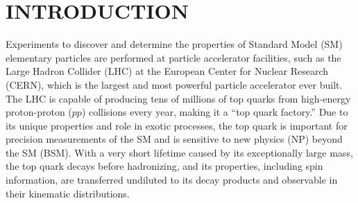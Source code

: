 
\chapter*{INTRODUCTION}
\label{Introduction}

Experiments to discover and determine the properties of Standard Model (SM) elementary particles are performed at particle accelerator facilities, such as the Large Hadron Collider (LHC) at the European Center for Nuclear Research (CERN), which is the largest and most powerful particle accelerator ever built.
The LHC is capable of producing tens of millions of top quarks from high-energy proton-proton ($pp$) collisions every year, making it a ``top quark factory.''
Due to its unique properties and role in exotic processes, the top quark is important for precision measurements of the SM and is sensitive to new physics (NP) beyond the SM (BSM).
With a very short lifetime caused by its exceptionally large mass, the top quark decays before hadronizing, and its properties, including spin information, are transferred undiluted to its decay products and observable in their kinematic distributions.

